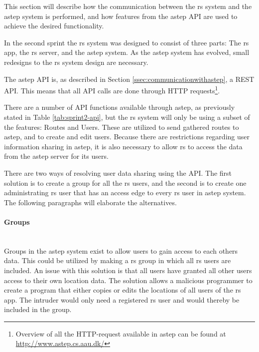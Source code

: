 This section will describe how the communication between the \gls{rs} system and the \gls{astep} system is performed, and how features from the \gls{astep} API are used to achieve the desired functionality.

In the second sprint the \gls{rs} system was designed to consist of three parts: The \gls{rs} app, the \gls{rs} server, and the \gls{astep} system.
As the \gls{astep} system has evolved, small redesigns to the \gls{rs} system design are necessary.

The \gls{astep} API is, as described in Section \ref{ssec:communicationwithastep}, a REST API. 
This means that all API calls are done through HTTP requests\footnote{Overview of all the HTTP-request available in \gls{astep} can be found at \url{http://www.astep.cs.aau.dk/}}.

There are a number of API functions available through \gls{astep}, as previously stated in Table \ref{tab:sprint2-api}, but the \gls{rs} system will only be using a subset of the features: Routes and Users.
These are utilized to send gathered routes to \gls{astep}, and to create and edit users.
Because there are restrictions regarding user information sharing in \gls{astep}, it is also necessary to allow \gls{rs} to access the data from the \gls{astep} server for its users.

There are two ways of resolving user data sharing using the API.
The first solution is to create a group for all the \gls{rs} users, and the second is to create one administrating \gls{rs} user that has an access edge to every \gls{rs} user in \gls{astep} system.
The following paragraphs will elaborate the alternatives.

\paragraph{Groups}\\ 
Groups in the \gls{astep} system exist to allow users to gain access to each others data.
This could be utilized by making a \gls{rs} group in which all \gls{rs} users are included.
An issue with this solution is that all users have granted all other users access to their own location data. 
The solution allows a malicious programmer to create a program that either copies or edits the locations of all users of the \gls{rs} app.
The intruder would only need a registered \gls{rs} user and would thereby be included in the group.

